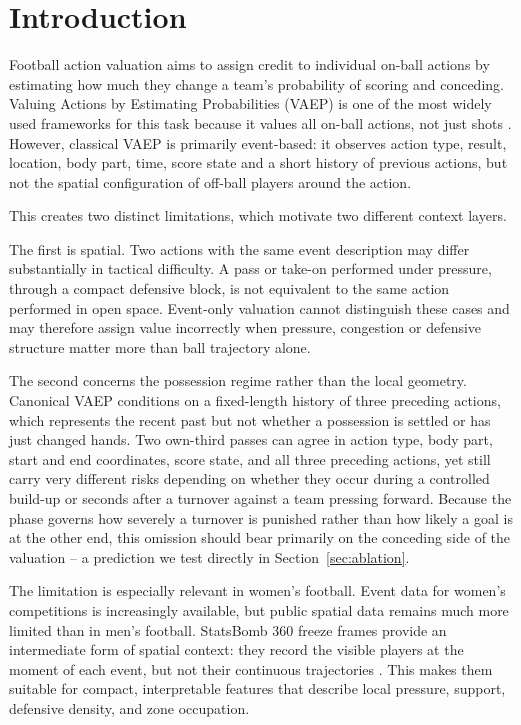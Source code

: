 \documentclass[runningheads]{llncs}
\begin{document}
\section{Introduction}

Football action valuation aims to assign credit to individual on-ball actions by estimating how much they change a team's probability of scoring and conceding. Valuing Actions by Estimating Probabilities (VAEP) is one of the most widely used frameworks for this task because it values all on-ball actions, not just shots \cite{decroos2019actions}. However, classical VAEP is primarily event-based: it observes action type, result, location, body part, time, score state and a short history of previous actions, but not the spatial configuration of off-ball players around the action.

This creates two distinct limitations, which motivate two different context layers.

The first is spatial. Two actions with the same event description may differ substantially in tactical difficulty. A pass or take-on performed under pressure, through a compact defensive block, is not equivalent to the same action performed in open space. Event-only valuation cannot distinguish these cases and may therefore assign value incorrectly when pressure, congestion or defensive structure matter more than ball trajectory alone.

The second concerns the possession regime rather than the local geometry. Canonical VAEP conditions on a fixed-length history of three preceding actions, which represents the recent past but not whether a possession is settled or has just changed hands. Two own-third passes can agree in action type, body part, start and end coordinates, score state, and all three preceding actions, yet still carry very different risks depending on whether they occur during a controlled build-up or seconds after a turnover against a team pressing forward. Because the phase governs how severely a turnover is punished rather than how likely a goal is at the other end, this omission should bear primarily on the conceding side of the valuation -- a prediction we test directly in Section~\ref{sec:ablation}.

The limitation is especially relevant in women's football. Event data for women's competitions is increasingly available, but public spatial data remains much more limited than in men's football. StatsBomb 360 freeze frames provide an intermediate form of spatial context: they record the visible players at the moment of each event, but not their continuous trajectories \cite{statsbomb2021freezeframe}. This makes them suitable for compact, interpretable features that describe local pressure, support, defensive density, and zone occupation.
\end{document}
